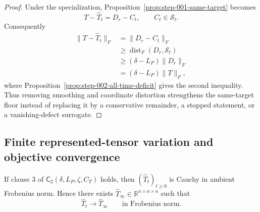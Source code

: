 \begin{proof}
Under the specialization,
Proposition~\ref{prop:step-001-same-target} becomes
\[
T-\widehat T_t=D_r-C_t,
\qquad C_t\in\mathcal S_t.
\]
Consequently
\[
\begin{aligned}
\|T-\widehat T_t\|_F
&=\|D_r-C_t\|_F\\
&\geq\operatorname{dist}_F(D_r,\mathcal S_t)\\
&\geq(\delta-L_P)\|D_r\|_F\\
&=(\delta-L_P)\|T\|_F,
\end{aligned}
\]
where Proposition~\ref{prop:step-002-all-time-deficit} gives the second
inequality.  Thus removing smoothing and coordinate distortion strengthens
the same-target floor instead of replacing it by a conservative remainder,
a stopped statement, or a vanishing-defect surrogate.
\end{proof}

\subsection{Finite represented-tensor variation and objective convergence}
\label{app:step-004}

\begin{lemma}
\label{lem:step-004-finite-variation}
If clause 3 of $\mathsf C_2(\delta,L_P,\zeta,C_T)$ holds, then
$(\widehat T_t)_{t\geq0}$ is Cauchy in ambient Frobenius norm.  Hence there
exists $\widehat T_\infty\in\mathbb R^{n\times n\times n}$ such that
\[
\widehat T_t\longrightarrow\widehat T_\infty
\qquad\text{in Frobenius norm}.
\]
\end{lemma}

